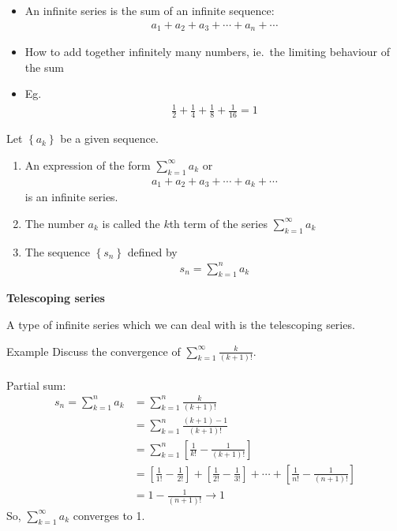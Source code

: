 \documentclass{report}
\begin{document}
	\begin{itemize}
		\item An infinite series is the sum of an infinite sequence:
			\begin{align*}
				a_1 + a_2 + a_3 + \cdots + a_n + \cdots
			\end{align*}
		\item How to add together infinitely many numbers, ie.\ the limiting behaviour of the sum
		\item Eg.
			\begin{align*}
				\frac{1}{2} + \frac{1}{4} + \frac{1}{8} + \frac{1}{16} = 1
			\end{align*}
	\end{itemize}

	Let $\left\{a_k\right\}$ be a given sequence.
	\begin{enumerate}
		\item An expression of the form $\sum_{k=1}^\infty a_k$ or
			\begin{align*}
				a_1 + a_2 + a_3 + \cdots + a_k + \cdots
			\end{align*}
			is an infinite series.
		\item The number $a_k$ is called the $k$th term of the series $\sum_{k=1}^\infty a_k$
		\item The sequence $\left\{s_n\right\}$ defined by
			\begin{align*}
				s_n = \sum_{k=1}^n a_k
			\end{align*}
	\end{enumerate}

	\textbf{Telescoping series}

		A type of infinite series which we can deal with is the telescoping series.

		\begin{question}{Example}
			Discuss the convergence of $\displaystyle\sum_{k=1}^\infty \frac{k}{(k+1)!}$.
			\\ \\
			Partial sum:
			\begin{align*}
				s_n = \sum_{k=1}^n a_k &= \sum_{k=1}^n \frac{k}{(k+1)!}	\\
									   &= \sum_{k=1}^n \frac{(k + 1) - 1}{(k+1)!}	\\
									   &= \sum_{k=1}^n \left[ \frac{1}{k!} - \frac{1}{(k+1)!} \right]	\\
									   &= \left[ \frac{1}{1!} - \frac{1}{2!} \right] + \left[ \frac{1}{2!} - \frac{1}{3!} \right] + \cdots + \left[ \frac{1}{n!} - \frac{1}{(n+1)!} \right]	\\
									   &= 1 - \frac{1}{(n+1)!} \to 1
			\end{align*}
			So, $\displaystyle\sum_{k=1}^\infty a_k$ converges to 1.
		\end{question}
\end{document}
